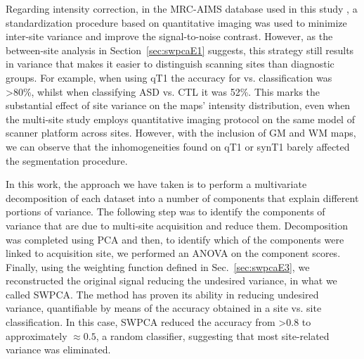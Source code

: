 Regarding intensity correction, in the \ac{MRC-AIMS} database used in this study \cite{Ecker2012,Ecker2013}, a standardization procedure based on quantitative imaging \cite{deoni2008standardized} was used to minimize inter-site variance and improve the signal-to-noise contrast. However, as the between-site analysis in Section~\ref{sec:swpcaE1} suggests, this strategy still results in variance that makes it easier to distinguish scanning sites than diagnostic groups. For example, when using \ac{qT1} the accuracy for \lon{} vs. \cam{} classification was {\textgreater}80\%, whilst when classifying \ac{ASD} vs. \ac{CTL} it was 52\%. This marks the substantial effect of site variance on the maps' intensity distribution, even when the multi-site study employs quantitative imaging protocol on the same model of scanner platform across sites. However, with the inclusion of \ac{GM} and \ac{WM} maps, we can observe that the inhomogeneities found on \ac{qT1} or \ac{synT1} barely affected the segmentation procedure. 

In this work, the approach we have taken is to perform a multivariate decomposition of each dataset into a number of components that explain different portions of variance. The following step was to identify the components of variance that are due to multi-site acquisition and reduce them. Decomposition was completed using \ac{PCA} and then, to identify which of the components were linked to acquisition site, we performed an \ac{ANOVA} on the component scores. Finally, using the weighting function defined in Sec.~\ref{sec:swpcaE3}, we reconstructed the original signal reducing the undesired variance, in what we called \ac{SWPCA}. The method has proven its ability in reducing undesired variance, quantifiable by means of the accuracy obtained in a site vs. site classification. In this case, \ac{SWPCA} reduced the accuracy from {\textgreater}0.8 to approximately $\approx0.5$, a random classifier, suggesting that most site-related variance was eliminated. 

